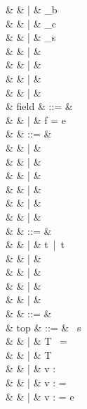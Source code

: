 \documentclass[a4paper]{article}
\begin{document}
{\begin{grammar}
                    &   & |   & \ell_b \\
                    &   & |   & \ell_c \\
                    &   & |   & \ell_s \\
                    &   & |   &  \\
                    &   & |   &  \\
                    &   & |   &  \\
                    &   & |   &  \\
   & field & ::= & \sALLFIELDS \\
               &       & |   & f = e \\
   & \tau & ::= & \stynf{\tau} \\
              &      & |   & \sUNBOX \tau \\
              &      & |   & \tau \sBANG \\
              &      & |   &  \\
              &      & |   & \stytake{\tau}{\sALLFIELDS} \\
              &      & |   &  \\
              &      & |   & \styput{\tau}{\sALLFIELDS} \\
   & \stynf{\tau} & ::= &  \\
                   &              & |   & t\sBANG\ |\ t \\
                   &              & |   & \styfun{\tau}{\tau} \\
                   &              & |   &  \\
                   &              & |   &  \\
                   &              & |   &  \\
   & \sigma & ::= & \ \tau \\
   & top & ::= & \sINCLUDE\ s \\
                   &     & |   & T\  = \tau \\
                   &     & |   & T\  \\
                   &     & |   & v : \sigma \\
                   &     & |   & v : \sigma =  \\
                   &     & |   & v : \tau = e
\end{grammar}
}
\end{document}
